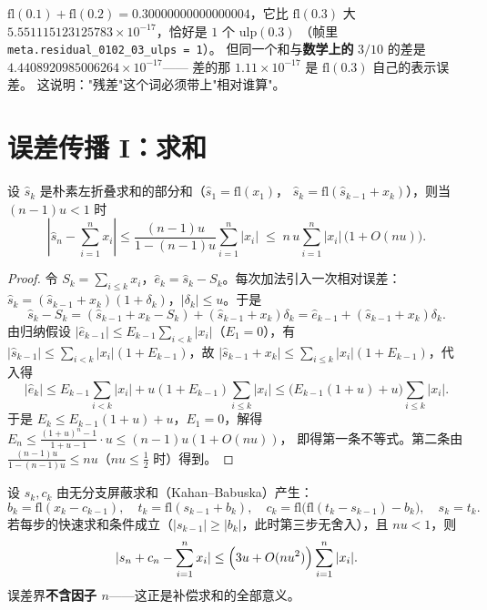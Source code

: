 \begin{remark}[$0.1+0.2$ 落在这个网格的哪里]
$\mathrm{fl}(0.1)+\mathrm{fl}(0.2)=0.30000000000000004$，它比 $\mathrm{fl}(0.3)$ 大
$5.551115123125783\times10^{-17}$，恰好是 $1$ 个 $\mathrm{ulp}(0.3)$
（帧里 \texttt{meta.residual\_0102\_03\_ulps = 1}）。
但同一个和与\textbf{数学上的} $3/10$ 的差是 $4.4408920985006264\times10^{-17}$——
差的那 $1.11\times10^{-17}$ 是 $\mathrm{fl}(0.3)$ 自己的表示误差。
这说明："残差"这个词必须带上"相对谁算"。
\end{remark}

\section{误差传播 I：求和}

\begin{theorem}
\label{thm:wilkinson}
设 $\hat s_k$ 是朴素左折叠求和的部分和（$\hat s_1=\mathrm{fl}(x_1)$，
$\hat s_k=\mathrm{fl}(\hat s_{k-1}+x_k)$），则当 $(n-1)u<1$ 时
\[
  \left|\hat s_n-\sum_{i=1}^{n}x_i\right|\le\frac{(n-1)u}{1-(n-1)u}\sum_{i=1}^{n}|x_i|
  \;\le\;n\,u\sum_{i=1}^{n}|x_i|\,\bigl(1+O(nu)\bigr).
\]
\end{theorem}

\begin{proof}
令 $S_k=\sum_{i\le k}x_i$，$\hat e_k=\hat s_k-S_k$。每次加法引入一次相对误差：
$\hat s_k=(\hat s_{k-1}+x_k)(1+\delta_k)$，$|\delta_k|\le u$。于是
\[
  \hat s_k-S_k=(\hat s_{k-1}+x_k-S_k)+(\hat s_{k-1}+x_k)\delta_k
  =\hat e_{k-1}+(\hat s_{k-1}+x_k)\delta_k .
\]
由归纳假设 $|\hat e_{k-1}|\le E_{k-1}\sum_{i<k}|x_i|$（$E_1=0$），有
$|\hat s_{k-1}|\le\sum_{i<k}|x_i|(1+E_{k-1})$，故
$|\hat s_{k-1}+x_k|\le\sum_{i\le k}|x_i|(1+E_{k-1})$，代入得
\[
  |\hat e_k|\le E_{k-1}\sum_{i<k}|x_i|+u(1+E_{k-1})\sum_{i\le k}|x_i|
  \le\bigl(E_{k-1}(1+u)+u\bigr)\sum_{i\le k}|x_i|.
\]
于是 $E_k\le E_{k-1}(1+u)+u$，$E_1=0$，解得 $E_n\le\frac{(1+u)^n-1}{1+u-1}\cdot u\le(n-1)u(1+O(nu))$，
即得第一条不等式。第二条由 $\frac{(n-1)u}{1-(n-1)u}\le nu$（$nu\le\tfrac12$ 时）得到。
\end{proof}

\begin{theorem}[补偿求和的误差界]
\label{thm:kahan}
设 $s_k,c_k$ 由无分支屏蔽求和（Kahan--Babuska）产生：
\[
  b_k=\mathrm{fl}(x_k-c_{k-1}),\quad t_k=\mathrm{fl}(s_{k-1}+b_k),\quad
  c_k=\mathrm{fl}\bigl(\mathrm{fl}(t_k-s_{k-1})-b_k\bigr),\quad s_k=t_k .
\]
若每步的快速求和条件成立（$|s_{k-1}|\ge|b_k|$，此时第三步无舍入），且 $nu<1$，则
\[
  |s_n+c_n-\sum_{i=1}^n x_i|\le\Bigl(3u+O(nu^2)\Bigr)\sum_{i=1}^n|x_i| .
\]
误差界\textbf{不含因子 $n$}——这正是补偿求和的全部意义。
\end{theorem}

